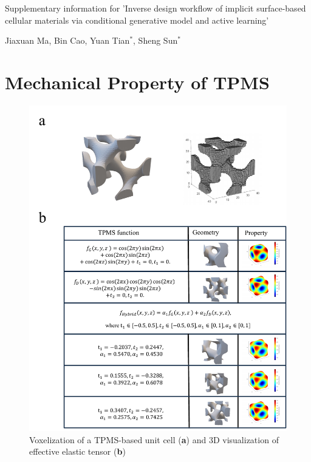 \documentclass[preprint,review,12pt,authoryear]{elsarticle}
\begin{document}


\begin{center}
\Large 
Supplementary information for 'Inverse design workflow of implicit surface-based cellular materials via conditional generative model and active learning'
\end{center}

\begin{center}
    Jiaxuan Ma, Bin Cao, Yuan Tian$^*$, Sheng Sun$^*$
\end{center}



\section{Mechanical Property of TPMS}

\begin{figure}
    \centering
    \includegraphics[width=1\linewidth]{figures/S1.pdf}
    \caption{Voxelization of a TPMS-based unit cell (\textbf{a}) and 3D visualization of effective elastic tensor (\textbf{b})}
    \label{fig:s1}
\end{figure}
\end{document}
